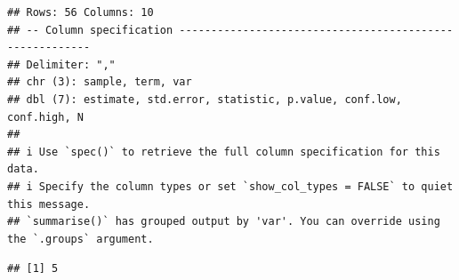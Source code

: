 \documentclass[
]{article}
\begin{document}
\begin{verbatim}
## Rows: 56 Columns: 10
## -- Column specification --------------------------------------------------------
## Delimiter: ","
## chr (3): sample, term, var
## dbl (7): estimate, std.error, statistic, p.value, conf.low, conf.high, N
## 
## i Use `spec()` to retrieve the full column specification for this data.
## i Specify the column types or set `show_col_types = FALSE` to quiet this message.
## `summarise()` has grouped output by 'var'. You can override using the `.groups` argument.
\end{verbatim}

\begin{verbatim}
## [1] 5
\end{verbatim}

\begin{table}
\centering
\caption{\label{tab:sob-gpt-reason-table}Second Order Beliefs: Reasons (GPT)}
\centering
{}
\end{table}
\end{document}
